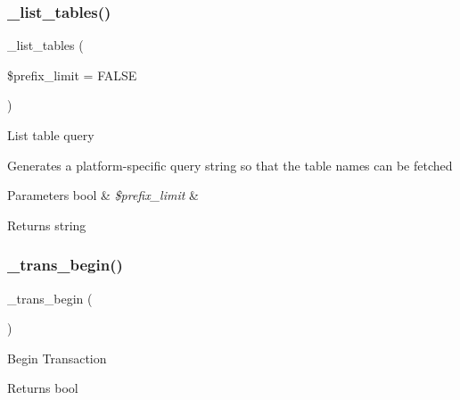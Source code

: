 \subsubsection{\texorpdfstring{\+\_\+list\+\_\+tables()}{\_list\_tables()}}
{\footnotesize\ttfamily \+\_\+list\+\_\+tables (\begin{DoxyParamCaption}\item[{}]{\$prefix\+\_\+limit = {\ttfamily FALSE} }\end{DoxyParamCaption})\hspace{0.3cm}{\ttfamily [protected]}}

List table query

Generates a platform-\/specific query string so that the table names can be fetched


\begin{DoxyParams}[1]{Parameters}
bool & {\em \$prefix\+\_\+limit} & \\
\hline
\end{DoxyParams}
\begin{DoxyReturn}{Returns}
string 
\end{DoxyReturn}
\mbox{\label{class_c_i___d_b__ibase__driver_ac81ac882c1d54347d810199a15856aac}} 
\subsubsection{\texorpdfstring{\+\_\+trans\+\_\+begin()}{\_trans\_begin()}}
{\footnotesize\ttfamily \+\_\+trans\+\_\+begin (\begin{DoxyParamCaption}{ }\end{DoxyParamCaption})\hspace{0.3cm}{\ttfamily [protected]}}

Begin Transaction

\begin{DoxyReturn}{Returns}
bool 
\end{DoxyReturn}
\mbox{\label{class_c_i___d_b__ibase__driver_a6fe7f373e0b11cfae23a5f41c0b35dda}} 
